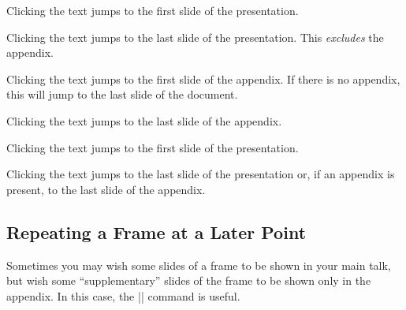 \begin{command}{\hyperlinkpresentationstart{}}
  Clicking the text jumps to the first slide of the presentation.
\end{command}

\begin{command}{\hyperlinkpresentationend{}}
  Clicking the text jumps to the last slide of the presentation. This \emph{excludes} the appendix.
\end{command}

\begin{command}{\hyperlinkappendixstart{}}
  Clicking the text jumps to the first slide of the appendix. If there is no appendix, this will jump to the last slide of the document.
\end{command}

\begin{command}{\hyperlinkappendixend{}}
  Clicking the text jumps to the last slide of the appendix.
\end{command}

\begin{command}{\hyperlinkdocumentstart{}}
  Clicking the text jumps to the first slide of the presentation.
\end{command}

\begin{command}{\hyperlinkdocumentend{}}
  Clicking the text jumps to the last slide of the presentation or, if an appendix is present, to the last slide of the appendix.
\end{command}


\subsection{Repeating a Frame at a Later Point}

Sometimes you may wish some slides of a frame to be shown in your main talk, but wish some ``supplementary'' slides of the frame to be shown only in the appendix. In this case, the |\againframe| command is useful.

